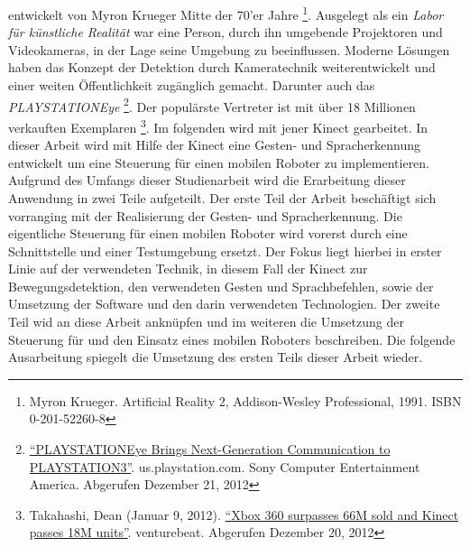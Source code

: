  entwickelt von Myron Krueger Mitte der 70'er Jahre \footnote{Myron Krueger. Artificial Reality 2, Addison-Wesley Professional, 1991. ISBN 0-201-52260-8}.
Ausgelegt als ein \textit{Labor f\"ur k\"unstliche Realit\"at} war eine Person, durch ihn umgebende Projektoren und Videokameras, in der Lage seine Umgebung zu beeinflussen.
Moderne L\"osungen haben das Konzept der Detektion durch Kameratechnik weiterentwickelt und einer weiten \"Offentlichkeit zug\"anglich gemacht. Darunter auch das \textit{PLAYSTATIONEye}
\footnote{\href{http://us.playstation.com/ps3/accessories/playstation-eye-camera-ps3.html}{\enquote{PLAYSTATIONEye Brings Next-Generation Communication to PLAYSTATION3}}. us.playstation.com. Sony Computer Entertainment America. Abgerufen Dezember 21, 2012}.
Der popul\"arste Vertreter ist \textit{} mit \"uber 18 Millionen verkauften Exemplaren
\footnote{Takahashi, Dean (Januar 9, 2012). \href{http://venturebeat.com/2012/01/09/xbox-360-surpassed-66m-sold-and-kinect-has-sold-18m-units/}{\enquote{Xbox 360 surpasses 66M sold and Kinect passes 18M units}}. venturebeat. Abgerufen Dezember 20, 2012}.
Im folgenden wird mit jener Kinect gearbeitet. 
\newline
In dieser Arbeit wird mit Hilfe der Kinect eine Gesten- und Spracherkennung entwickelt um eine Steuerung f\"ur einen mobilen Roboter zu implementieren.
Aufgrund des Umfangs dieser Studienarbeit wird die Erarbeitung dieser Anwendung in zwei Teile aufgeteilt.
\newline
Der erste Teil der Arbeit besch\"aftigt sich vorranging mit der Realisierung der Gesten- und Spracherkennung.
Die eigentliche Steuerung f\"ur einen mobilen Roboter wird vorerst durch eine Schnittstelle und einer Testumgebung ersetzt.
Der Fokus liegt hierbei in erster Linie auf der verwendeten Technik, in diesem Fall der Kinect zur \gls{Bewegungsdetektion}, den verwendeten Gesten und Sprachbefehlen,
sowie der Umsetzung der Software und den darin verwendeten Technologien.
Der zweite Teil wid an diese Arbeit ankn\"upfen und im weiteren die Umsetzung der Steuerung f\"ur und den Einsatz eines mobilen Roboters beschreiben.
\newline
Die folgende Ausarbeitung spiegelt die Umsetzung des ersten Teils dieser Arbeit wieder.